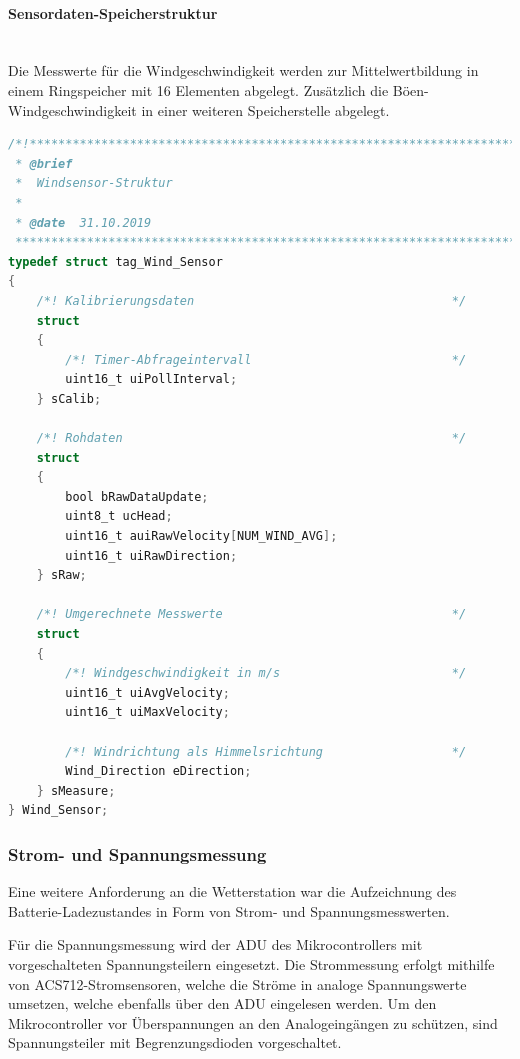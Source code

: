             \paragraph{Sensordaten-Speicherstruktur}\mbox{}\\
            Die Messwerte für die Windgeschwindigkeit werden zur Mittelwertbildung in einem Ringspeicher mit 16 Elementen abgelegt. Zusätzlich die Böen-Windgeschwindigkeit in einer weiteren Speicherstelle abgelegt.
            
            \begin{lstlisting}[language=C,caption={Typdefinition für die Messdaten zur Bestimmung der Windrichtung und -geschwindigkeit},label=lst:wind_typedef]
/*!****************************************************************************
 * @brief
 *  Windsensor-Struktur
 *
 * @date  31.10.2019
 ******************************************************************************/
typedef struct tag_Wind_Sensor
{
    /*! Kalibrierungsdaten                                    */
    struct
    {
        /*! Timer-Abfrageintervall                            */
        uint16_t uiPollInterval;
    } sCalib;
    
    /*! Rohdaten                                              */
    struct
    {
        bool bRawDataUpdate;
        uint8_t ucHead;
        uint16_t auiRawVelocity[NUM_WIND_AVG];
        uint16_t uiRawDirection;
    } sRaw;
    
    /*! Umgerechnete Messwerte                                */
    struct
    {
        /*! Windgeschwindigkeit in m/s                        */
        uint16_t uiAvgVelocity;
        uint16_t uiMaxVelocity;
        
        /*! Windrichtung als Himmelsrichtung                  */
        Wind_Direction eDirection;
    } sMeasure;
} Wind_Sensor;
            \end{lstlisting}
            
        \subsubsection{Strom- und Spannungsmessung}
            Eine weitere Anforderung an die Wetterstation war die Aufzeichnung des Batterie-Ladezustandes in Form von Strom- und Spannungsmesswerten.
            
            Für die Spannungsmessung wird der ADU des Mikrocontrollers mit vorgeschalteten Spannungsteilern eingesetzt. Die Strommessung erfolgt mithilfe von ACS712-Stromsensoren, welche die Ströme in analoge Spannungswerte umsetzen, welche ebenfalls über den ADU eingelesen werden. Um den Mikrocontroller vor Überspannungen an den Analogeingängen zu schützen, sind Spannungsteiler mit Begrenzungsdioden vorgeschaltet.             
            
